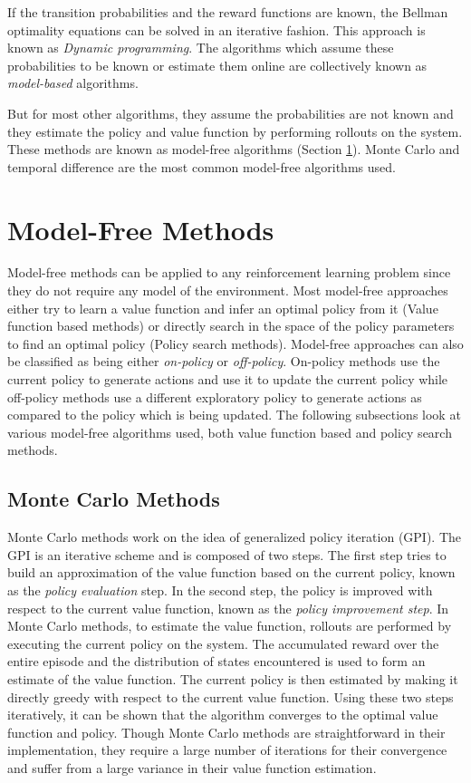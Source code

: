         If the transition probabilities and the reward functions are known, the Bellman optimality equations can be solved in an iterative fashion. This approach is known as \textit{Dynamic programming}. The algorithms which assume these probabilities to be known or estimate them online are collectively known as \textit{model-based} algorithms.
        \par
        But for most other algorithms, they assume the probabilities are not known and they estimate the policy and value function by performing rollouts on the system. These methods are known as model-free algorithms (Section \ref{sec:25}). Monte Carlo and temporal difference are the most common model-free algorithms used.
    
    \section{Model-Free Methods}\label{sec:25} 
            Model-free methods can be applied to any reinforcement learning problem since they do not
        require any model of the environment. Most model-free approaches either try to learn a value
        function and infer an optimal policy from it (Value function based methods) or directly search
        in the space of the policy parameters to find an optimal policy (Policy search methods).
        Model-free approaches can also be classified as being either \textit{on-policy} or \textit{off-policy}. On-policy
        methods use the current policy to generate actions and use it to update the current policy
        while off-policy methods use a different exploratory policy to generate actions as compared
        to the policy which is being updated. The following subsections look at various model-free
        algorithms used, both value function based and policy search methods.
        \subsection{Monte Carlo Methods}
                Monte Carlo methods work on the idea of generalized policy iteration (GPI). The GPI is an
        iterative scheme and is composed of two steps. The first step tries to build an approximation
        of the value function based on the current policy, known as the \textit{policy evaluation} step. In the
        second step, the policy is improved with respect to the current value function, known as the
        \textit{policy improvement step}. In Monte Carlo methods, to estimate the value function, rollouts
        are performed by executing the current policy on the system. The accumulated reward over
        the entire episode and the distribution of states encountered is used to form an estimate of
        the value function. The current policy is then estimated by making it directly greedy with
        respect to the current value function. Using these two steps iteratively, it can be shown that
        the algorithm converges to the optimal value function and policy. Though Monte Carlo methods are straightforward in their implementation, they require a large number of iterations for
        their convergence and suffer from a large variance in their value function estimation.
